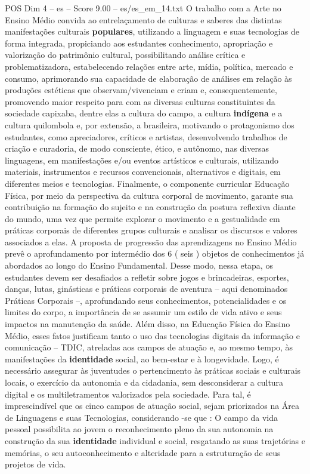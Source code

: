 \begin{textsample}{POS Dim 4 – es – Score 9.00 – es/es\_em\_14.txt}
O trabalho com a Arte no Ensino Médio convida ao entrelaçamento de culturas e saberes das distintas manifestações culturais \textbf{populares}, utilizando a linguagem e suas tecnologias de forma integrada, propiciando aos estudantes conhecimento, apropriação e valorização do patrimônio cultural, possibilitando análise crítica e problematizadora, estabelecendo relações entre arte, mídia, política, mercado e consumo, aprimorando sua capacidade de elaboração de análises em relação às produções estéticas que observam/vivenciam e criam e, consequentemente, promovendo maior respeito para com as diversas culturas constituintes da sociedade capixaba, dentre elas a cultura do campo, a cultura \textbf{indígena} e a cultura quilombola e, por extensão, a brasileira, motivando o protagonismo dos estudantes, como apreciadores, críticos e artistas, desenvolvendo trabalhos de criação e curadoria, de modo consciente, ético, e autônomo, nas diversas linguagens, em manifestações e/ou eventos artísticos e culturais, utilizando materiais, instrumentos e recursos convencionais, alternativos e digitais, em diferentes meios e tecnologias.
Finalmente, o componente curricular Educação Física, por meio da perspectiva da cultura corporal de movimento, garante sua contribuição na formação do sujeito e na construção da postura reflexiva diante do mundo, uma vez que permite explorar o movimento e a gestualidade em práticas corporais de diferentes grupos culturais e analisar os discursos e valores associados a elas.
A proposta de progressão das aprendizagens no Ensino Médio prevê o aprofundamento por intermédio dos 6 ( seis ) objetos de conhecimentos já abordados ao longo do Ensino Fundamental.
Desse modo, nessa etapa, os estudantes devem ser desafiados a refletir sobre jogos e brincadeiras, esportes, danças, lutas, ginásticas e práticas corporais de aventura – aqui denominados Práticas Corporais –, aprofundando seus conhecimentos, potencialidades e os limites do corpo, a importância de se assumir um estilo de vida ativo e seus impactos na manutenção da saúde.
Além disso, na Educação Física do Ensino Médio, esses fatos justificam tanto o uso das tecnologias digitais da informação e comunicação – TDIC, atreladas aos campos de atuação e, ao mesmo tempo, às manifestações da \textbf{identidade} social, ao bem-estar e à longevidade.
Logo, é necessário assegurar às juventudes o pertencimento às práticas sociais e culturais locais, o exercício da autonomia e da cidadania, sem desconsiderar a cultura digital e os multiletramentos valorizados pela sociedade.
Para tal, é imprescindível que os cinco campos de atuação social, sejam priorizados na Área de Linguagens e suas Tecnologias, considerando -se que : O campo da vida pessoal possibilita ao jovem o reconhecimento pleno da sua autonomia na construção da sua \textbf{identidade} individual e social, resgatando as suas trajetórias e memórias, o seu autoconhecimento e alteridade para a estruturação de seus projetos de vida.

\end{textsample}
